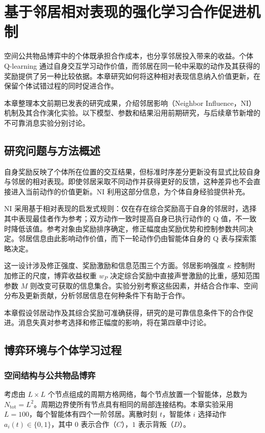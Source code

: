 \chapter{基于邻居相对表现的强化学习合作促进机制}
\label{chap:work1}

空间公共物品博弈中的个体既承担合作成本，也分享邻居投入带来的收益。个体 Q-learning 通过自身交互学习动作价值，而邻居在同一轮中采取的动作及其获得的奖励提供了另一种比较依据。本章研究如何将这种相对表现信息纳入价值更新，在保留个体试错过程的同时促进合作。

本章整理本文前期已发表的研究成果\cite{kang2025neighbor}，介绍邻居影响（Neighbor Influence，NI）机制及其合作演化实验。以下模型、参数和结果沿用前期研究，与后续章节新增的不可靠消息实验分别讨论。

\section{研究问题与方法概述}

自身奖励反映了个体所在位置的交互结果，但标准时序差分更新没有显式比较自身与邻居的相对表现。即使邻居采取不同动作并获得更好的反馈，这种差异也不会直接进入当前动作的价值更新。NI 利用这部分信息，为个体自身经验提供补充。

NI 采用基于相对表现的启发式规则：仅在存在综合奖励高于自身的邻居时，选择其中表现最佳者作为参考；双方动作一致时提高自身已执行动作的 Q 值，不一致时降低该值。参考对象由奖励排序确定，修正幅度由奖励优势和控制参数共同决定。邻居信息由此影响动作价值，而下一轮动作仍由智能体自身的 Q 表与探索策略决定。

这一设计涉及修正强度、奖励激励和信息范围三个方面。邻居影响强度 $\kappa$ 控制附加修正的尺度，博弈收益权重 $w_P$ 决定综合奖励中直接声誉激励的比重，感知范围参数 $M$ 则改变可获取的信息集合。实验分别考察这些因素，并结合合作率、空间分布及更新贡献，分析邻居信息在何种条件下有助于合作。

本章假设邻居动作及其综合奖励可准确获得，研究的是可靠信息条件下的合作促进。消息失真对参考选择和修正幅度的影响，将在第四章中讨论。

\section{博弈环境与个体学习过程}
\subsection{空间结构与公共物品博弈}

考虑由 $L\times L$ 个节点组成的周期方格网络，每个节点放置一个智能体，总数为 $N_{\mathrm{tot}}=L^2$。周期边界使所有节点具有相同的局部连接结构。本章实验采用 $L=100$，每个智能体有四个一阶邻居。离散时刻 $t$，智能体 $i$ 选择动作 $a_i(t)\in\{0,1\}$，其中 $0$ 表示合作（$C$），$1$ 表示背叛（$D$）。


